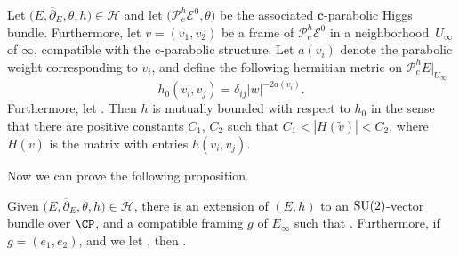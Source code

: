 \begin{Theorem}[{\cite[Proposition 8.1.1]{M}}]\label{FT2} Let $\bigl(E,\overline{\partial}_E,\theta,h\bigr)\in \mathcal{H}$ and let $\bigl(\mathcal{P}^h_{c}\mathcal{E}^{0},\theta\bigr)$ be the associated $\boldsymbol{c}$-parabolic Higgs bundle. Furthermore, let $v=(v_1,v_2)$ be a frame of $\mathcal{P}^h_{c}\mathcal{E}^{0}$ in a neighborhood~$U_{\infty}$ of $\infty$, compatible with the c-parabolic structure. Let $a(v_i)$ denote the parabolic weight corresponding to $v_{i}$, and define the following hermitian metric on $\mathcal{P}^h_{c}E|_{U_{\infty}}$
\begin{equation*}
 h_0(v_{i},v_{j})=\delta_{ij}|w|^{-2a(v_i)}.
\end{equation*}
Furthermore, let . Then $h$ is mutually bounded with respect to $h_0$ in the sense that there are positive constants $C_1$, $C_2$ such that
$
 C_1<|H(\widetilde{v})|<C_2$,
where $H(\widetilde{v})$ is the matrix with entries $h(\widetilde{v}_{i},\widetilde{v}_{j})$.
\end{Theorem}

Now we can prove the following proposition.

\begin{Proposition} \label{constructionframe} Given $\bigl(E,\overline{\partial}_E,\theta,h\bigr)\in \mathcal{H}$, there is an extension of $(E,h)$ to an ${\rm SU}(2)$-vector bundle over $\CP$, and a compatible framing $g$ of $E_{\infty}$ such that . Further\-mo\-re, if $g=(e_1,e_2)$,  and we let , then .
\end{Proposition}

